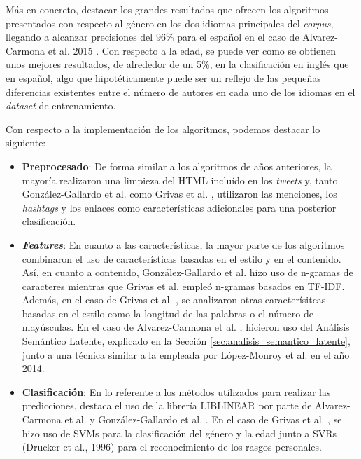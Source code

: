 \bigskip
Más en concreto, destacar los grandes resultados que
ofrecen los algoritmos presentados con respecto al género en los dos idiomas principales del \textit{corpus}, llegando a alcanzar
precisiones del 96\% para el español en el caso de Alvarez-Carmona et al. 2015 \cite{alvarez2015inaoe}. Con respecto a la edad,
se puede ver como se obtienen unos mejores resultados, de alrededor de un 5\%, en la clasificación en inglés que en español, algo que
hipotéticamente puede ser un reflejo de las pequeñas diferencias existentes entre el número de autores en cada uno de los idiomas en
el \textit{dataset} de entrenamiento.

\bigskip
Con respecto a la implementación de los algoritmos, podemos destacar lo siguiente:

\begin{itemize}
	\item \textbf{Preprocesado}: De forma similar a los algoritmos de años anteriores, la mayoría realizaron una limpieza del HTML incluído
	en los \textit{tweets} y, tanto González-Gallardo et al. \cite{gonzalez2015tweets} como Grivas et al. \cite{grivas2015author}, utilizaron
	las menciones, los \textit{hashtags} y los enlaces como características adicionales para una posterior clasificación.
	\item \textbf{\textit{Features}}: En cuanto a las características, la mayor parte de los algoritmos combinaron el uso de características
	basadas en el estilo y en el contenido. Así, en cuanto a contenido, González-Gallardo et al. \cite{gonzalez2015tweets} hizo uso de n-gramas de caracteres
	mientras que Grivas et al. \cite{grivas2015author} empleó n-gramas basados en TF-IDF. Además, en el caso de Grivas et al. \cite{grivas2015author},
	se analizaron otras caracterísitcas basadas en el estilo como la longitud de las palabras o el número de mayúsculas. En el caso de Alvarez-Carmona et al. \cite{alvarez2015inaoe},
	hicieron uso del Análisis Semántico Latente, explicado en la Sección \ref{sec:analisis_semantico_latente}, junto a una técnica similar a la empleada por
	López-Monroy et al. \cite{lopez2014using} en el año 2014.
	\item \textbf{Clasificación}: En lo referente a los métodos utilizados para realizar las predicciones, destaca el uso de la librería LIBLINEAR \cite{fan2008liblinear}
	por parte de Alvarez-Carmona et al. \cite{alvarez2015inaoe} y González-Gallardo et al. \cite{gonzalez2015tweets}. En el caso de Grivas et al. \cite{grivas2015author}, se hizo
	uso de SVMs para la clasificación del género y la edad junto a SVRs (Drucker et al., 1996) \cite{drucker1996support} para el reconocimiento de los rasgos personales.
\end{itemize}


